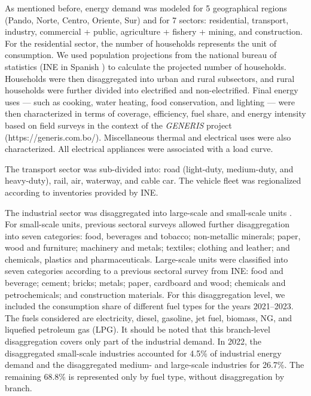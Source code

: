 \documentclass[a4paper,fleqn]{cas-dc}
\begin{document}
As mentioned before, energy demand was modeled for 5 geographical regions (Pando, Norte, Centro, Oriente, Sur) and for 7 sectors: residential, transport, industry, commercial + public, agriculture + fishery + mining, and construction. For the residential sector, the number of households represents the unit of consumption. We used population projections from the national bureau of statistics (INE in Spanish \cite{INE2024CPV}) to calculate the projected number of households. Households were then disaggregated into urban and rural subsectors, and rural households were further divided into electrified and non-electrified. Final energy uses — such as cooking, water heating, food conservation, and lighting — were then characterized in terms of coverage, efficiency, fuel share, and energy intensity based on field surveys in the context of the \textit{GENERIS} project (https://generis.com.bo/). Miscellaneous thermal and electrical uses were also characterized. All electrical appliances were associated with a load curve.

The transport sector was sub-divided into: road (light-duty, medium-duty, and heavy-duty), rail, air, waterway, and cable car. The vehicle fleet was regionalized according to inventories provided by INE.

The industrial sector was disaggregated into large-scale and small-scale units \cite{sarmiento2025energia}. For small-scale units, previous sectoral surveys allowed further disaggregation into seven categories: food, beverages and tobacco; non-metallic minerals; paper, wood and furniture; machinery and metals; textiles; clothing and leather; and chemicals, plastics and pharmaceuticals. Large-scale units were classified into seven categories according to a previous sectoral survey from INE: food and beverage; cement; bricks; metals; paper, cardboard and wood; chemicals and petrochemicals; and construction materials. For this disaggregation level, we included the consumption share of different fuel types for the years 2021–2023. The fuels considered are electricity, diesel, gasoline, jet fuel, biomass, NG, and liquefied petroleum gas (LPG). It should be noted that this branch-level disaggregation covers only part of the industrial demand. In 2022, the disaggregated small-scale industries accounted for 4.5\% of industrial energy demand and the disaggregated medium- and large-scale industries for 26.7\%. The remaining 68.8\% is represented only by fuel type, without disaggregation by branch.
\end{document}
